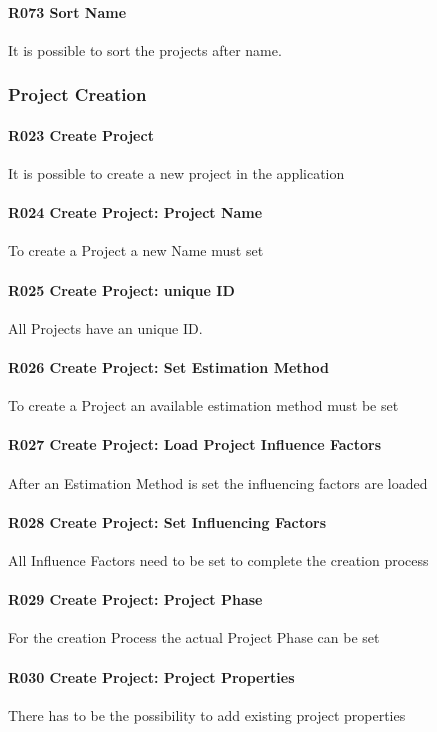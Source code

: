 \paragraph{R073 Sort Name}
It is possible to sort the projects after name.

\subsubsection{Project Creation}
\paragraph{R023 Create Project}
It is possible to create a new project in the application
\paragraph{R024 Create Project: Project Name}
To create a Project a new Name must set
\paragraph{R025 Create Project: unique ID}
All Projects have an unique ID.
\paragraph{R026 Create Project: Set Estimation Method}
To create a Project an available estimation method must be set
\paragraph{R027 Create Project: Load Project Influence Factors}
After an Estimation Method is set the influencing factors are loaded
\paragraph{R028 Create Project: Set Influencing Factors}
All Influence Factors need to be set to complete the creation process
\paragraph{R029 Create Project: Project Phase}
For the creation Process the actual Project Phase can be set
\paragraph{R030 Create Project: Project Properties}
There has to be the possibility to add existing project properties
